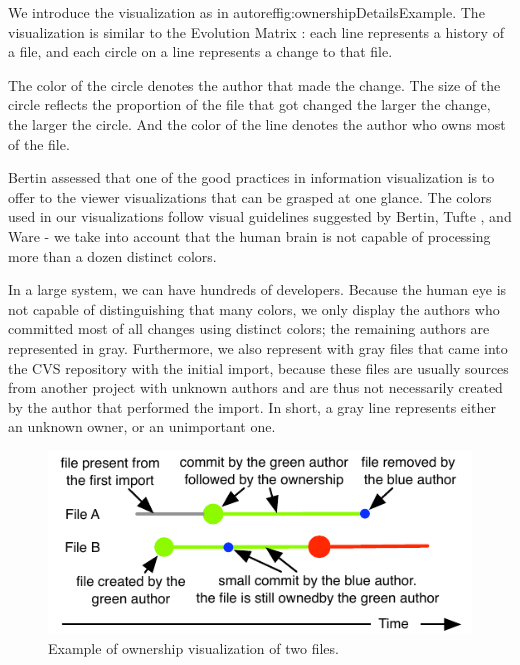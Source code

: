 We introduce the \omap visualization as in autoref{fig:ownershipDetailsExample}. The visualization is similar to the Evolution Matrix \cite{Lanz02a}: each line represents a history of a file, and each circle on a line represents a change to that file.

The color of the circle denotes the author that made the change. The size of the circle reflects the proportion of the file that got changed \ie the larger the change, the larger the circle. And the color of the line denotes the author who owns most of the file.

Bertin \cite{Bert74a} assessed that one of the good practices in information visualization is to offer to the viewer visualizations that can be grasped at one glance. The colors used in our visualizations follow visual guidelines suggested by Bertin, Tufte \cite{Tuft90a}, and Ware \cite{Ware00a} \-- \eg we take into account that the human brain is not capable of processing more than a dozen distinct colors.

In a large system, we can have hundreds of developers. Because the human eye is not capable of distinguishing that many colors, we only display the authors who committed most of all changes using distinct colors; the remaining authors are represented in gray. Furthermore, we also represent with gray files that came into the CVS repository with the initial import, because these files are usually sources from another project with unknown authors and are thus not necessarily created by the author that performed the import. In short, a gray line represents either an unknown owner, or an unimportant one.

\begin{figure}[htb]
\begin{center}
\includegraphics[width=\linewidth]{fig/hapax-owners-map-detail.pdf}
\caption{Example of ownership visualization of two files.}
\label{fig:ownershipDetailsExample}
\end{center}
\end{figure}

